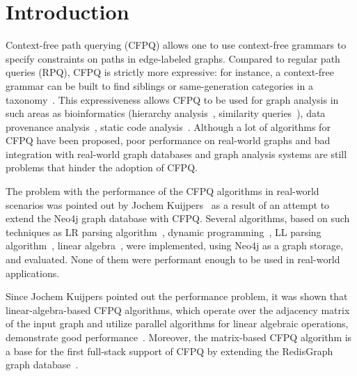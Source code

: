 \documentclass[
11pt,%
tightenlines,%
twoside,%
onecolumn,%
nobibnotes,%
nofootinbib,%
superscriptaddress,%
noshowpacs,%
longbibliography,%
centertags]%
{revtex4-2}
\begin{document}
\maketitle
\renewcommand{\figurename}{Fig.} 
\section{Introduction}

Context-free path querying (CFPQ) allows one to use context-free grammars to specify constraints on paths in edge-labeled graphs. Compared to regular path queries (RPQ), CFPQ is strictly more expressive: for instance, a context-free grammar can be built to find siblings or same-generation categories in a taxonomy~\cite{Azimov:2018:CPQ:3210259.3210264,Kuijpers:2019:ESC:3335783.3335791}. This expressiveness allows CFPQ to be used for graph analysis in such areas as bioinformatics (hierarchy analysis~\cite{zhangCfPgRdf}, similarity queries~\cite{SubgraphQueriesbyContextfreeGrammars}), data provenance analysis~\cite{8731467}, static code analysis~\cite{Zheng,10.1145/373243.360208}. Although a lot of algorithms for CFPQ have been proposed, poor performance on real-world graphs and bad integration with real-world graph databases and graph analysis systems are still problems that hinder the adoption of CFPQ.

The problem with the performance of the CFPQ algorithms in real-world scenarios was pointed out by Jochem Kuijpers~\cite{Kuijpers:2019:ESC:3335783.3335791} as a result of an attempt to extend the Neo4j graph database with CFPQ. Several algorithms, based on such techniques as LR parsing algorithm~\cite{santosBottomUp}, dynamic programming~\cite{hellingsRelational}, LL parsing algorithm~\cite{10.1145/3167132.3167265}, linear algebra~\cite{Azimov:2018:CPQ:3210259.3210264}, were implemented, using Neo4j as a graph storage, and evaluated. None of them were performant enough to be used in real-world applications.   

Since Jochem Kuijpers pointed out the performance problem, it was shown that linear-algebra-based CFPQ algorithms, which operate over the adjacency matrix of the input graph and utilize parallel algorithms for linear algebraic operations, demonstrate good performance~\cite{10.1145/3398682.3399163}. Moreover, the matrix-based CFPQ algorithm is a base for the first full-stack support of CFPQ by extending the RedisGraph graph database~\cite{10.1145/3398682.3399163}.  
\end{document}
